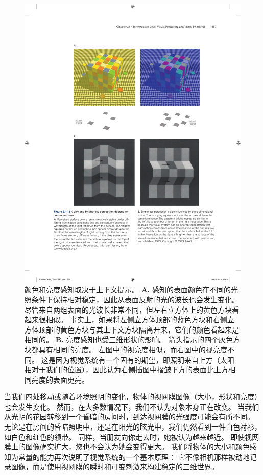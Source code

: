 \begin{figure}[htbp]
	\centering
	\includegraphics[width=1.0\linewidth]{chap23/fig_23_12}
	\caption{颜色和亮度感知取决于上下文提示。
		\textbf{A.} 感知的表面颜色在不同的光照条件下保持相对稳定，因此从表面反射的光的波长也会发生变化。
		尽管来自两组表面的光波长非常不同，但左右立方体上的黄色方块看起来很相似。
		事实上，如果将左侧立方体顶部的蓝色方块和右侧立方体顶部的黄色方块与其上下文方块隔离开来，它们的颜色看起来是相同的。
		\textbf{B.} 亮度感知也受三维形状的影响。
		箭头指示的四个灰色方块都具有相同的亮度。
		左图中的视亮度相似，而右图中的视亮度不同。
		这是因为视觉系统有一个固有的期望，即照明来自上方（太阳相对于我们的位置），因此认为右侧插图中褶皱下方的表面比上方相同亮度的表面更亮\cite{adelson1993perceptual}。}
	\label{fig:23_12}
\end{figure}


当我们四处移动或随着环境照明的变化，物体的视网膜图像（大小，形状和亮度）也会发生变化。
然而，在大多数情况下，我们不认为对象本身正在改变。 
当我们从光明的花园转移到一个昏暗的房间时，到达视网膜的光强度可能会有所不同。
无论是在房间的昏暗照明中，还是在阳光的眩光中，我们仍然看到一件白色衬衫，如白色和红色的领带。
同样，当朋友向你走去时，她被认为越来越近。
即使视网膜上的图像确实扩大，您也不会认为她会变得更大。
我们将物体的大小和颜色感知为常量的能力再次说明了视觉系统的一个基本原理：
它不像相机那样被动地记录图像，而是使用视网膜的瞬时和可变刺激来构建稳定的三维世界。


